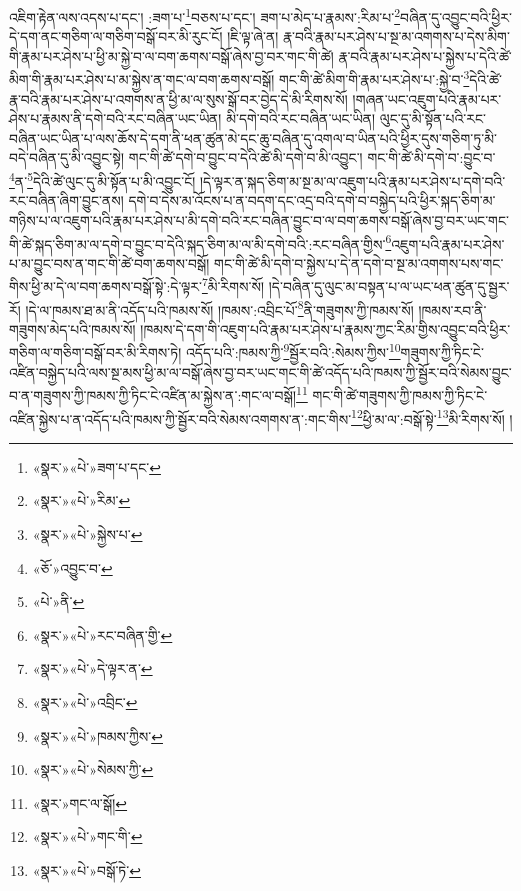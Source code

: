 འཇིག་རྟེན་ལས་འདས་པ་དང་། :ཟག་པ་\footnote{«སྣར་»«པེ་»ཟག་པ་དང་}བཅས་པ་དང་། ཟག་པ་མེད་པ་རྣམས་:རིམ་པ་\footnote{«སྣར་»«པེ་»རིམ་}བཞིན་དུ་འབྱུང་བའི་ཕྱིར་དེ་དག་ནང་གཅིག་ལ་གཅིག་བསྒོ་བར་མི་རུང་ངོ། །ཇི་ལྟ་ཞེ་ན། རྣ་བའི་རྣམ་པར་ཤེས་པ་སྔ་མ་འགགས་པ་དེས་མིག་གི་རྣམ་པར་ཤེས་པ་ཕྱི་མ་སྐྱེ་བ་ལ་བག་ཆགས་བསྒོ་ཞེས་བྱ་བར་གང་གི་ཚེ། རྣ་བའི་རྣམ་པར་ཤེས་པ་སྐྱེས་པ་དེའི་ཚེ་མིག་གི་རྣམ་པར་ཤེས་པ་མ་སྐྱེས་ན་གང་ལ་བག་ཆགས་བསྒོ། གང་གི་ཚེ་མིག་གི་རྣམ་པར་ཤེས་པ་:སྐྱེ་བ་\footnote{«སྣར་»«པེ་»སྐྱེས་པ་}དེའི་ཚེ་རྣ་བའི་རྣམ་པར་ཤེས་པ་འགགས་ན་ཕྱི་མ་ལ་སུས་སྒོ་བར་བྱེད་དེ་མི་རིགས་སོ། །གཞན་ཡང་འཇུག་པའི་རྣམ་པར་ཤེས་པ་རྣམས་ནི་དགེ་བའི་རང་བཞིན་ཡང་ཡིན། མི་དགེ་བའི་རང་བཞིན་ཡང་ཡིན། ལུང་དུ་མི་སྟོན་པའི་རང་བཞིན་ཡང་ཡིན་པ་ལས་ཆོས་དེ་དག་ནི་ཕན་ཚུན་མེ་དང་ཆུ་བཞིན་དུ་འགལ་བ་ཡིན་པའི་ཕྱིར་དུས་གཅིག་ཏུ་མི་བདེ་བཞིན་དུ་མི་འབྱུང་སྟེ། གང་གི་ཚེ་དགེ་བ་བྱུང་བ་དེའི་ཚེ་མི་དགེ་བ་མི་འབྱུང་། གང་གི་ཚེ་མི་དགེ་བ་:བྱུང་བ་\footnote{«ཅོ་»འབྱུང་བ་}ན་\footnote{«པེ་»ནི་}དེའི་ཚེ་ལུང་དུ་མི་སྟོན་པ་མི་འབྱུང་ངོ། །དེ་ལྟར་ན་སྐད་ཅིག་མ་སྔ་མ་ལ་འཇུག་པའི་རྣམ་པར་ཤེས་པ་དགེ་བའི་རང་བཞིན་ཞིག་བྱུང་ནས། དགེ་བ་དེས་མ་འོངས་པ་ན་བདག་དང་འདྲ་བའི་དགེ་བ་བསྐྱེད་པའི་ཕྱིར་སྐད་ཅིག་མ་གཉིས་པ་ལ་འཇུག་པའི་རྣམ་པར་ཤེས་པ་མི་དགེ་བའི་རང་བཞིན་བྱུང་བ་ལ་བག་ཆགས་བསྒོ་ཞེས་བྱ་བར་ཡང་གང་གི་ཚེ་སྐད་ཅིག་མ་ལ་དགེ་བ་བྱུང་བ་དེའི་སྐད་ཅིག་མ་ལ་མི་དགེ་བའི་:རང་བཞིན་གྱིས་\footnote{«སྣར་»«པེ་»རང་བཞིན་གྱི་}འཇུག་པའི་རྣམ་པར་ཤེས་པ་མ་བྱུང་བས་ན་གང་གི་ཚེ་བག་ཆགས་བསྒོ། གང་གི་ཚེ་མི་དགེ་བ་སྐྱེས་པ་དེ་ན་དགེ་བ་སྔ་མ་འགགས་པས་གང་གིས་ཕྱི་མ་དེ་ལ་བག་ཆགས་བསྒོ་སྟེ་:དེ་ལྟར་\footnote{«སྣར་»«པེ་»དེ་ལྟར་ན་}མི་རིགས་སོ། །དེ་བཞིན་དུ་ལུང་མ་བསྟན་པ་ལ་ཡང་ཕན་ཚུན་དུ་སྦྱར་རོ། །དེ་ལ་ཁམས་ཐ་མ་ནི་འདོད་པའི་ཁམས་སོ། །ཁམས་:འབྲིང་པོ་\footnote{«སྣར་»«པེ་»འབྲིང་}ནི་གཟུགས་ཀྱི་ཁམས་སོ། །ཁམས་རབ་ནི་གཟུགས་མེད་པའི་ཁམས་སོ། །ཁམས་དེ་དག་གི་འཇུག་པའི་རྣམ་པར་ཤེས་པ་རྣམས་ཀྱང་རིམ་གྱིས་འབྱུང་བའི་ཕྱིར་གཅིག་ལ་གཅིག་བསྒོ་བར་མི་རིགས་ཏེ། འདོད་པའི་:ཁམས་ཀྱི་\footnote{«སྣར་»«པེ་»ཁམས་ཀྱིས་}སྦྱོར་བའི་:སེམས་ཀྱིས་\footnote{«སྣར་»«པེ་»སེམས་ཀྱི་}གཟུགས་ཀྱི་ཏིང་ངེ་འཛིན་བསྐྱེད་པའི་ལས་སྔ་མས་ཕྱི་མ་ལ་བསྒོ་ཞེས་བྱ་བར་ཡང་གང་གི་ཚེ་འདོད་པའི་ཁམས་ཀྱི་སྦྱོར་བའི་སེམས་བྱུང་བ་ན་གཟུགས་ཀྱི་ཁམས་ཀྱི་ཏིང་ངེ་འཛིན་མ་སྐྱེས་ན་:གང་ལ་བསྒོ།\footnote{«སྣར་»གང་ལ་སྒོ།} གང་གི་ཚེ་གཟུགས་ཀྱི་ཁམས་ཀྱི་ཏིང་ངེ་འཛིན་སྐྱེས་པ་ན་འདོད་པའི་ཁམས་ཀྱི་སྦྱོར་བའི་སེམས་འགགས་ན་:གང་གིས་\footnote{«སྣར་»«པེ་»གང་གི་}ཕྱི་མ་ལ་:བསྒོ་སྟེ་\footnote{«སྣར་»«པེ་»བསྒོ་ཏེ་}མི་རིགས་སོ། །

